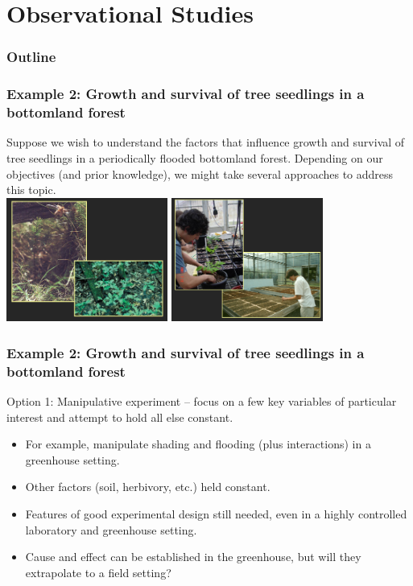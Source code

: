 \documentclass[color=usenames,dvipsnames]{beamer}\usepackage[]{graphicx}\usepackage[]{xcolor}
\begin{document}
\section{Observational Studies}



\begin{frame}
  \frametitle{Outline}
  \Large
  \tableofcontents[currentsection]
\end{frame}



\begin{frame}
  \frametitle{Example 2: Growth and survival of
    tree seedlings in a bottomland forest}
  Suppose we wish to understand the factors that influence growth and
  survival of tree seedlings in a periodically flooded bottomland
  forest.  Depending on our objectives (and prior knowledge), we might
  take several approaches to address this topic. \\
  \vfill
  \includegraphics[height=1.6in]{seedlings-obs} \hfill
  \includegraphics[height=1.6in]{seedlings-exp} 
\end{frame}



\begin{frame}
  \frametitle{Example 2: Growth and survival of
    tree seedlings in a bottomland forest}
  Option 1: Manipulative experiment -- focus on a few key variables of
  particular interest and attempt to hold all else constant.
  \vspace{6pt}
  \begin{itemize}
    \item For example, manipulate shading and flooding (plus
      interactions) in a greenhouse setting.
    \item Other factors (soil, herbivory, etc.)  held constant.
    \item Features of good experimental design still needed, even in a
      highly controlled laboratory and greenhouse setting.
    \item Cause and effect can be established in the greenhouse, but
      will they extrapolate to a field setting?
  \end{itemize}
\end{frame}
\end{document}
